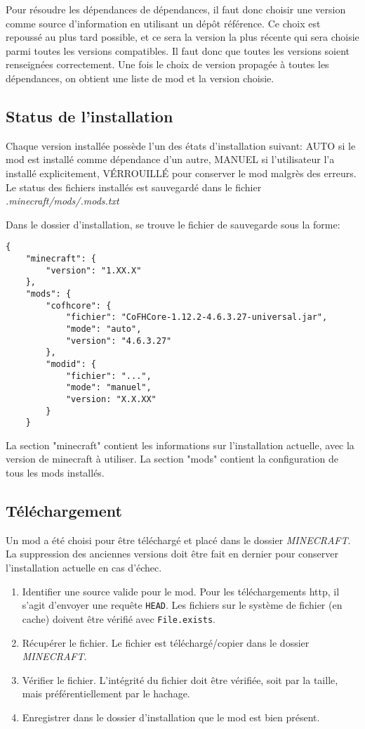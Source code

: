 \documentclass{article}
\begin{document}
Pour résoudre les dépendances de dépendances, il faut donc choisir une version comme source d'information en utilisant un dépôt référence.
Ce choix est repoussé au plus tard possible, et ce sera la version la plus récente qui sera choisie parmi toutes les versions compatibles.
Il faut donc que toutes les versions soient renseignées correctement.
Une fois le choix de version propagée à toutes les dépendances, on obtient une liste de mod et la version choisie.

\subsection{Status de l'installation}
Chaque version installée possède l'un des états d'installation suivant: AUTO si le mod est installé comme dépendance d'un autre, MANUEL si l'utilisateur l'a installé explicitement, VÉRROUILLÉ pour conserver le mod malgrès des erreurs.
Le status des fichiers installés est sauvegardé dans le fichier \textit{.minecraft/mods/.mods.txt}

Dans le dossier d'installation, se trouve le fichier de sauvegarde sous la forme:
\begin{verbatim}
{
    "minecraft": {
        "version": "1.XX.X"
    },
    "mods": {
        "cofhcore": {
            "fichier": "CoFHCore-1.12.2-4.6.3.27-universal.jar",
            "mode": "auto",
            "version": "4.6.3.27"
        },
        "modid": {
            "fichier": "...",
            "mode": "manuel",
            "version: "X.X.XX"
        }
    }
\end{verbatim}

La section "minecraft" contient les informations sur l'installation actuelle, avec la version de minecraft à utiliser.
La section "mods" contient la configuration de tous les mods installés.

\subsection{Téléchargement}
Un mod a été choisi pour être téléchargé et placé dans le dossier \textit{MINECRAFT}.
La suppression des anciennes versions doit être fait en dernier pour conserver l'installation actuelle en cas d'échec.

\begin{enumerate}
    \item Identifier une source valide pour le mod.
Pour les téléchargements http, il s'agit d'envoyer une requête \texttt{HEAD}.
Les fichiers sur le système de fichier (en cache) doivent être vérifié avec \texttt{File.exists}.
    \item Récupérer le fichier.
Le fichier est téléchargé/copier dans le dossier \textit{MINECRAFT}.
    \item Vérifier le fichier.
L'intégrité du fichier doit être vérifiée, soit par la taille, mais préférentiellement par le hachage.
    \item Enregistrer dans le dossier d'installation que le mod est bien présent.
\end{enumerate}
\end{document}
